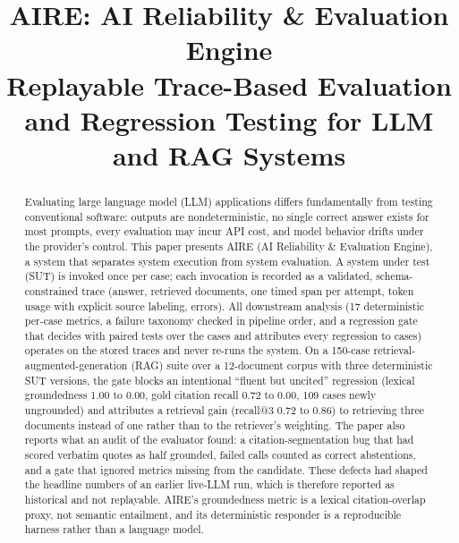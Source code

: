\documentclass[conference]{IEEEtran}
\begin{document}
\title{AIRE: AI Reliability \& Evaluation Engine\\
\large Replayable Trace-Based Evaluation and Regression Testing for LLM and RAG Systems}

\author{
}

\maketitle

\begin{abstract}
Evaluating large language model (LLM) applications differs fundamentally from
testing conventional software: outputs are nondeterministic, no single
correct answer exists for most prompts, every evaluation may incur API cost,
and model behavior drifts under the provider's control. This paper presents
AIRE (AI Reliability \& Evaluation Engine), a system that separates system
execution from system evaluation. A system under test (SUT) is invoked once
per case; each invocation is recorded as a validated, schema-constrained
trace (answer, retrieved documents, one timed span per attempt, token usage
with explicit source labeling, errors). All downstream analysis (17
deterministic per-case metrics, a failure taxonomy checked in pipeline
order, and a regression gate that decides with paired tests over the
cases and attributes every regression to cases) operates on the stored
traces and never re-runs the system. On a 150-case
retrieval-augmented-generation (RAG) suite over a 12-document corpus with
three deterministic SUT versions, the gate blocks an intentional ``fluent
but uncited'' regression (lexical groundedness 1.00 to 0.00, gold citation
recall 0.72 to 0.00, 109 cases newly ungrounded) and attributes a retrieval
gain (recall@3 0.72 to 0.86) to retrieving three documents instead of one
rather than to the retriever's weighting. The paper also reports what an
audit of the evaluator found: a citation-segmentation bug that had scored
verbatim quotes as half grounded, failed calls counted as correct
abstentions, and a gate that ignored metrics missing from the candidate.
These defects had shaped the headline numbers of an earlier live-LLM run,
which is therefore reported as historical and not replayable. AIRE's
groundedness metric is a lexical citation-overlap proxy, not semantic
entailment, and its deterministic responder is a reproducible harness rather
than a language model.
\end{abstract}
\end{document}
